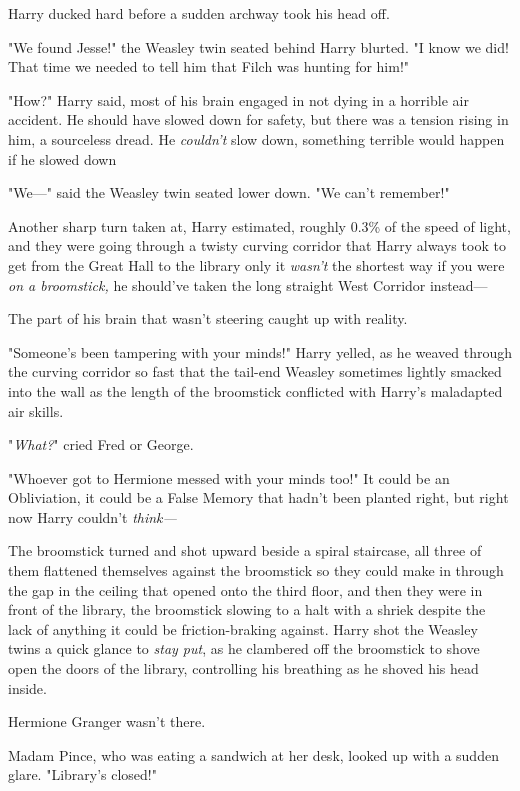 Harry ducked hard before a sudden archway took his head off.

"We found Jesse!" the Weasley twin seated behind Harry blurted. "I know we did!
That time we needed to tell him that Filch was hunting for him!"

"How?" Harry said, most of his brain engaged in not dying in a horrible air
accident. He should have slowed down for safety, but there was a tension rising
in him, a sourceless dread. He \emph{couldn't} slow down, something terrible
would happen if he slowed down{\el}

"We—" said the Weasley twin seated lower down. "We can't remember!"

Another sharp turn taken at, Harry estimated, roughly 0.3\% of the speed of
light, and they were going through a twisty curving corridor that Harry always
took to get from the Great Hall to the library only it \emph{wasn't} the
shortest way if you were \emph{on a broomstick,} he should've taken the long
straight West Corridor instead—

The part of his brain that wasn't steering caught up with reality.

"Someone's been tampering with your minds!" Harry yelled, as he weaved through
the curving corridor so fast that the tail-end Weasley sometimes lightly
smacked into the wall as the length of the broomstick conflicted with Harry's
maladapted air skills.

"\emph{What?}" cried Fred or George.

"Whoever got to Hermione messed with your minds too!" It could be an
Obliviation, it could be a False Memory that hadn't been planted right, but
right now Harry couldn't \emph{think—}

The broomstick turned and shot upward beside a spiral staircase, all three of
them flattened themselves against the broomstick so they could make in through
the gap in the ceiling that opened onto the third floor, and then they were in
front of the library, the broomstick slowing to a halt with a shriek despite
the lack of anything it could be friction-braking against. Harry shot the
Weasley twins a quick glance to \emph{stay put}, as he clambered off the
broomstick to shove open the doors of the library, controlling his breathing as
he shoved his head inside.

Hermione Granger wasn't there.

Madam Pince, who was eating a sandwich at her desk, looked up with a sudden
glare. "Library's closed!"

